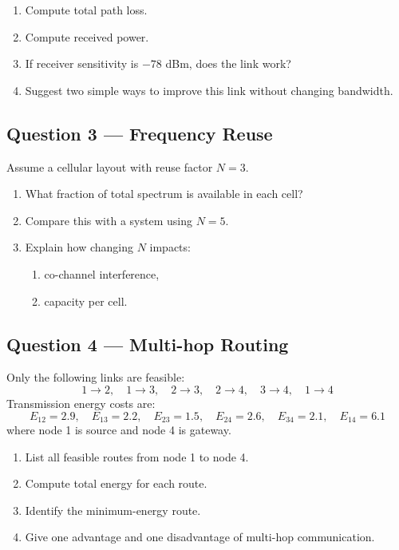 \documentclass[11pt,a4paper]{article}
\begin{document}
\begin{enumerate}[label=\alph*)]
    \item Compute total path loss.
    \item Compute received power.
    \item If receiver sensitivity is $-78$ dBm, does the link work?
    \item Suggest two simple ways to improve this link without changing bandwidth.
\end{enumerate}

\subsection*{Question 3 --- Frequency Reuse}
Assume a cellular layout with reuse factor $N=3$.

\begin{enumerate}[label=\alph*)]
    \item What fraction of total spectrum is available in each cell?
    \item Compare this with a system using $N=5$.
    \item Explain how changing $N$ impacts:
    \begin{enumerate}[label=\roman*)]
        \item co-channel interference,
        \item capacity per cell.
    \end{enumerate}
\end{enumerate}

\subsection*{Question 4 --- Multi-hop Routing}
Only the following links are feasible:
\[
1 \rightarrow 2,\quad 1 \rightarrow 3,\quad 2 \rightarrow 3,\quad 2 \rightarrow 4,\quad 3 \rightarrow 4,\quad 1 \rightarrow 4
\]
Transmission energy costs are:
\[
E_{12}=2.9,\quad E_{13}=2.2,\quad E_{23}=1.5,\quad E_{24}=2.6,\quad E_{34}=2.1,\quad E_{14}=6.1
\]
where node 1 is source and node 4 is gateway.

\begin{enumerate}[label=\alph*)]
    \item List all feasible routes from node 1 to node 4.
    \item Compute total energy for each route.
    \item Identify the minimum-energy route.
    \item Give one advantage and one disadvantage of multi-hop communication.
\end{enumerate}
\end{document}

